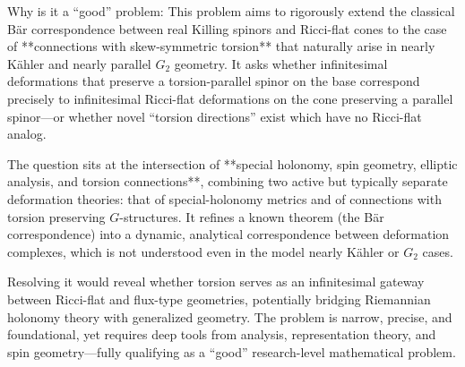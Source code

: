 Why is it a “good” problem:  
This problem aims to rigorously extend the classical Bär correspondence between real Killing spinors and Ricci-flat cones to the case of **connections with skew-symmetric torsion** that naturally arise in nearly Kähler and nearly parallel \(G_2\) geometry.  It asks whether infinitesimal deformations that preserve a torsion-parallel spinor on the base correspond precisely to infinitesimal Ricci-flat deformations on the cone preserving a parallel spinor—or whether novel “torsion directions” exist which have no Ricci-flat analog.  

The question sits at the intersection of **special holonomy, spin geometry, elliptic analysis, and torsion connections**, combining two active but typically separate deformation theories: that of special-holonomy metrics and of connections with torsion preserving \(G\)-structures.  It refines a known theorem (the Bär correspondence) into a dynamic, analytical correspondence between deformation complexes, which is not understood even in the model nearly Kähler or \(G_2\) cases.  

Resolving it would reveal whether torsion serves as an infinitesimal gateway between Ricci-flat and flux-type geometries, potentially bridging Riemannian holonomy theory with generalized geometry.  The problem is narrow, precise, and foundational, yet requires deep tools from analysis, representation theory, and spin geometry—fully qualifying as a “good” research-level mathematical problem.